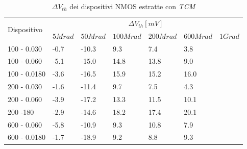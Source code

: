 \documentclass[
	a4paper,
	cleardoublepage=empty,
	headings=twolinechapter,
	numbers=autoenddot,
]{scrbook}
\begin{document}
\begin{table}[H]
  \renewcommand{\arraystretch}{1.3}
  \begin{tabular}{m{2.1cm}  m{1.1cm} m{1.3cm} m{1.5cm} m{1.5cm} m{1.5cm} m{1cm}}
    \toprule
    \multirow{2}{*}{Dispositivo} & \multicolumn{6}{c}{$\Delta V_{th} [mV] $}                                                          \\
    \cmidrule{2-7}
                                 & $5Mrad$                                   & $50Mrad$ & $100Mrad$ & $200Mrad$ & $600Mrad$ & $1Grad$ \\
    \midrule
    100 - 0.030                     & -0.7                                      & -10.3    & 9.3       & 7.4       & 3.8       &         \\
    \hline
    100 - 0.060                     & -5.1                                      & -15.0    & 14.8      & 13.8      & 9.0       &         \\
    \hline
    100 - 0.0180                    & -3.6                                      & -16.5    & 15.9      & 15.2      & 16.0      &         \\
    \hline
    200 - 0.030                     & -1.6                                      & -11.4    & 9.7       & 7.5       & 4.3       &         \\
    \hline
    200 - 0.060                     & -3.9                                      & -17.2    & 13.3      & 11.5      & 10.1      &         \\
    \hline
    200 -180                     & -2.9                                      & -14.6    & 18.2      & 17.4      & 20.1      &         \\
    \hline
    600 - 0.060                     & -5.8                                      & -10.9    & 9.3       & 10.8      & 7.9       &         \\
    \hline
    600 - 0.0180                    & -1.7                                      & -18.9    & 9.2       & 8.8       & 9.3       &         \\
    \bottomrule
  \end{tabular}
  \caption{$\Delta V_{th}$ dei dispositivi NMOS estratte con \emph{TCM}}
  \label{tab:deltaVthTCMN}
\end{table}
\end{document}
